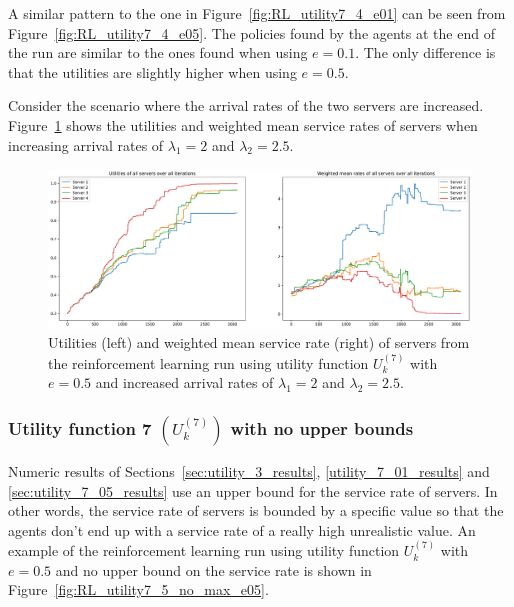 A similar pattern to the one in Figure~\ref{fig:RL_utility7_4_e01} can be seen
from Figure~\ref{fig:RL_utility7_4_e05}.
The policies found by the agents at the end of the run are similar to the ones
found when using \(e = 0.1\).
The only difference is that the utilities are slightly higher when using
\(e = 0.5\).

Consider the scenario where the arrival rates of the two servers are increased.
Figure~\ref{fig:RL_utility7_4_e05_Lambda_45} shows the utilities and weighted
mean service rates of servers when increasing arrival rates of
\(\lambda_1 = 2\) and \(\lambda_2 = 2.5\).

\begin{figure}[H]
    \includegraphics[width=\textwidth]{chapters/06_agent_based_extension/Bin/reinforcement_learning_results/utility_7/u7_4_e05_Lambda_45.pdf}
    \caption{Utilities (left) and weighted mean service rate (right) of servers
    from the reinforcement learning run using utility function \(U_k^{(7)}\)
    with \(e = 0.5\) and increased arrival rates of \(\lambda_1 = 2\) and
    \(\lambda_2 = 2.5\).}
    \label{fig:RL_utility7_4_e05_Lambda_45}
\end{figure}


\subsubsection{Utility function 7 \((U_k^{(7)})\) with no upper bounds}
\label{sec:utility_7_no_upper_bound_results}

Numeric results of Sections~\ref{sec:utility_3_results},
\ref{utility_7_01_results} and \ref{sec:utility_7_05_results} use an upper
bound for the service rate of servers.
In other words, the service rate of servers is bounded by a specific value
so that the agents don't end up with a service rate of a really high
unrealistic value.
An example of the reinforcement learning run using utility function
\(U_k^{(7)}\) with \(e = 0.5\) and no upper bound on the service rate is
shown in Figure~\ref{fig:RL_utility7_5_no_max_e05}.

